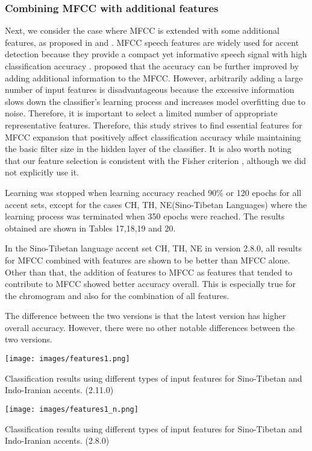 \documentclass[ams]{U-AizuGT}
\begin{document}
\subsubsection{Combining MFCC with additional features}
Next, we consider the case where MFCC is extended with some additional features, as proposed in \cite{Veranika:lang} and \cite{Singh:fea}. MFCC speech features are widely used for accent detection because they provide a compact yet informative speech signal with high classification accuracy \cite{Jiang:tow,Jiang:tow}. proposed that the accuracy can be further improved by adding additional information to the MFCC. However, arbitrarily adding a large number of input features is disadvantageous because the excessive information slows down the classifier's learning process and increases model overfitting due to noise. Therefore, it is important to select a limited number of appropriate representative features. Therefore, this study strives to find essential features for MFCC expansion that positively affect classification accuracy while maintaining the basic filter size in the hidden layer of the classifier. It is also worth noting that our feature selection is consistent with the Fisher criterion \cite{Longford:afa, Wu:fea, Sun:fea}, although we did not explicitly use it.\par
Learning was stopped when learning accuracy reached 90\% or 120 epochs for all accent sets, except for the cases {CH, TH, NE}(Sino-Tibetan Languages) where the learning process was terminated when 350 epochs were reached. The results obtained are shown in Tables 17,18,19 and 20.\par
In the Sino-Tibetan language accent set {CH, TH, NE} in version 2.8.0, all results for MFCC combined with features are shown to be better than MFCC alone. Other than that, the addition of features to MFCC as features that tended to contribute to MFCC showed better accuracy overall. This is especially true for the chromogram and also for the combination of all features.\par
The difference between the two versions is that the latest version has higher overall accuracy. However, there were no other notable differences between the two versions.
\begin{table}[h]
    \centering
    \texttt{[image: images/features1.png]}
    \caption{Classification results using different types of input features for Sino-Tibetan and Indo-Iranian accents. (2.11.0)}
\end{table}
\begin{table}[h]
    \centering
    \texttt{[image: images/features1\_n.png]}
    \caption{Classification results using different types of input features for Sino-Tibetan and Indo-Iranian accents. (2.8.0)}
\end{table}
\end{document}
